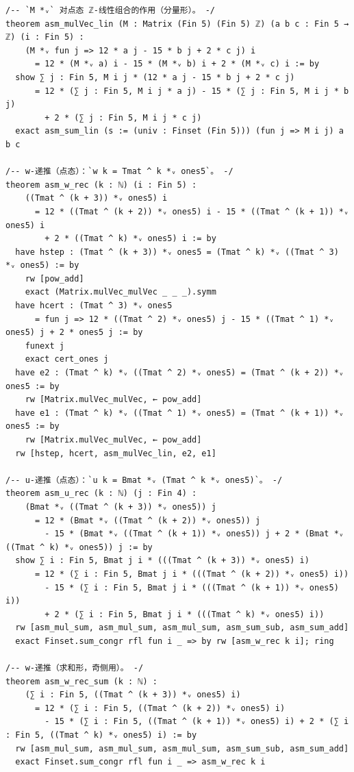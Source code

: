 \documentclass[11pt]{article}
\begin{document}
\begin{lstlisting}
/-- `M *ᵥ` 对点态 ℤ-线性组合的作用（分量形）。 -/
theorem asm_mulVec_lin (M : Matrix (Fin 5) (Fin 5) ℤ) (a b c : Fin 5 → ℤ) (i : Fin 5) :
    (M *ᵥ fun j => 12 * a j - 15 * b j + 2 * c j) i
      = 12 * (M *ᵥ a) i - 15 * (M *ᵥ b) i + 2 * (M *ᵥ c) i := by
  show ∑ j : Fin 5, M i j * (12 * a j - 15 * b j + 2 * c j)
      = 12 * (∑ j : Fin 5, M i j * a j) - 15 * (∑ j : Fin 5, M i j * b j)
        + 2 * (∑ j : Fin 5, M i j * c j)
  exact asm_sum_lin (s := (univ : Finset (Fin 5))) (fun j => M i j) a b c

/-- w-递推（点态）：`w k = Tmat ^ k *ᵥ ones5`。 -/
theorem asm_w_rec (k : ℕ) (i : Fin 5) :
    ((Tmat ^ (k + 3)) *ᵥ ones5) i
      = 12 * ((Tmat ^ (k + 2)) *ᵥ ones5) i - 15 * ((Tmat ^ (k + 1)) *ᵥ ones5) i
        + 2 * ((Tmat ^ k) *ᵥ ones5) i := by
  have hstep : (Tmat ^ (k + 3)) *ᵥ ones5 = (Tmat ^ k) *ᵥ ((Tmat ^ 3) *ᵥ ones5) := by
    rw [pow_add]
    exact (Matrix.mulVec_mulVec _ _ _).symm
  have hcert : (Tmat ^ 3) *ᵥ ones5
      = fun j => 12 * ((Tmat ^ 2) *ᵥ ones5) j - 15 * ((Tmat ^ 1) *ᵥ ones5) j + 2 * ones5 j := by
    funext j
    exact cert_ones j
  have e2 : (Tmat ^ k) *ᵥ ((Tmat ^ 2) *ᵥ ones5) = (Tmat ^ (k + 2)) *ᵥ ones5 := by
    rw [Matrix.mulVec_mulVec, ← pow_add]
  have e1 : (Tmat ^ k) *ᵥ ((Tmat ^ 1) *ᵥ ones5) = (Tmat ^ (k + 1)) *ᵥ ones5 := by
    rw [Matrix.mulVec_mulVec, ← pow_add]
  rw [hstep, hcert, asm_mulVec_lin, e2, e1]

/-- u-递推（点态）：`u k = Bmat *ᵥ (Tmat ^ k *ᵥ ones5)`。 -/
theorem asm_u_rec (k : ℕ) (j : Fin 4) :
    (Bmat *ᵥ ((Tmat ^ (k + 3)) *ᵥ ones5)) j
      = 12 * (Bmat *ᵥ ((Tmat ^ (k + 2)) *ᵥ ones5)) j
        - 15 * (Bmat *ᵥ ((Tmat ^ (k + 1)) *ᵥ ones5)) j + 2 * (Bmat *ᵥ ((Tmat ^ k) *ᵥ ones5)) j := by
  show ∑ i : Fin 5, Bmat j i * (((Tmat ^ (k + 3)) *ᵥ ones5) i)
      = 12 * (∑ i : Fin 5, Bmat j i * (((Tmat ^ (k + 2)) *ᵥ ones5) i))
        - 15 * (∑ i : Fin 5, Bmat j i * (((Tmat ^ (k + 1)) *ᵥ ones5) i))
        + 2 * (∑ i : Fin 5, Bmat j i * (((Tmat ^ k) *ᵥ ones5) i))
  rw [asm_mul_sum, asm_mul_sum, asm_mul_sum, asm_sum_sub, asm_sum_add]
  exact Finset.sum_congr rfl fun i _ => by rw [asm_w_rec k i]; ring

/-- w-递推（求和形，奇侧用）。 -/
theorem asm_w_rec_sum (k : ℕ) :
    (∑ i : Fin 5, ((Tmat ^ (k + 3)) *ᵥ ones5) i)
      = 12 * (∑ i : Fin 5, ((Tmat ^ (k + 2)) *ᵥ ones5) i)
        - 15 * (∑ i : Fin 5, ((Tmat ^ (k + 1)) *ᵥ ones5) i) + 2 * (∑ i : Fin 5, ((Tmat ^ k) *ᵥ ones5) i) := by
  rw [asm_mul_sum, asm_mul_sum, asm_mul_sum, asm_sum_sub, asm_sum_add]
  exact Finset.sum_congr rfl fun i _ => asm_w_rec k i


\end{lstlisting}
\end{document}
